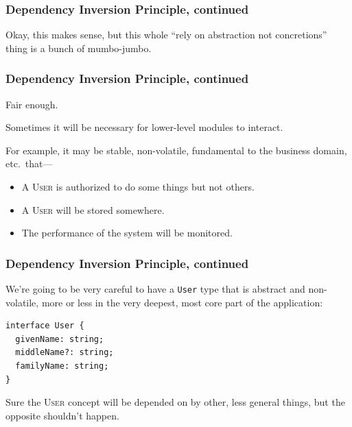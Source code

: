 \documentclass[aspectratio=169]{beamer}
\begin{document}
\begin{frame}
  \frametitle{Dependency Inversion Principle, continued}
  Okay, this makes sense, but this whole ``rely on abstraction not concretions''
  thing is a bunch of mumbo-jumbo.
\end{frame}

\begin{frame}
  \frametitle{Dependency Inversion Principle, continued}
  Fair enough.

  \vspace{1em}

  Sometimes it will be necessary for lower-level modules to interact.

  \vspace{1em}

  For example, it may be stable, non-volatile, fundamental to the business
  domain, etc.\ that---

  \begin{itemize}
    \item A \textsc{User} is authorized to do some things but not
          others.
    \item A \textsc{User} will be stored somewhere.
    \item The performance of the system will be monitored.
  \end{itemize}
\end{frame}

\begin{frame}[fragile]
  \frametitle{Dependency Inversion Principle, continued}
  We're going to be very careful to have a \texttt{User} type that is abstract
  and non-volatile, more or less in the very deepest, most core part of the
  application:

  \vspace{1em}

  \begin{verbatim}
interface User {
  givenName: string;
  middleName?: string;
  familyName: string;
}
  \end{verbatim}

  \vspace{1em}

  Sure the \textsc{User} concept will be depended on by other, less general
  things, but the opposite shouldn't happen.
\end{frame}
\end{document}
